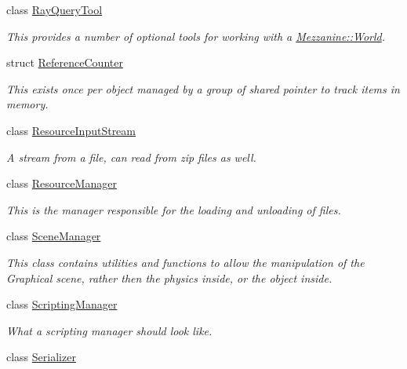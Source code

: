 \begin{DoxyCompactItemize}
class \hyperlink{classMezzanine_1_1RayQueryTool}{RayQueryTool}
\begin{DoxyCompactList}\small\item\em This provides a number of optional tools for working with a \hyperlink{classMezzanine_1_1World}{Mezzanine::World}. \item\end{DoxyCompactList}\item 
struct \hyperlink{structMezzanine_1_1ReferenceCounter}{ReferenceCounter}
\begin{DoxyCompactList}\small\item\em This exists once per object managed by a group of shared pointer to track items in memory. \item\end{DoxyCompactList}\item 
class \hyperlink{classMezzanine_1_1ResourceInputStream}{ResourceInputStream}
\begin{DoxyCompactList}\small\item\em A stream from a file, can read from zip files as well. \item\end{DoxyCompactList}\item 
class \hyperlink{classMezzanine_1_1ResourceManager}{ResourceManager}
\begin{DoxyCompactList}\small\item\em This is the manager responsible for the loading and unloading of files. \item\end{DoxyCompactList}\item 
class \hyperlink{classMezzanine_1_1SceneManager}{SceneManager}
\begin{DoxyCompactList}\small\item\em This class contains utilities and functions to allow the manipulation of the Graphical scene, rather then the physics inside, or the object inside. \item\end{DoxyCompactList}\item 
class \hyperlink{classMezzanine_1_1ScriptingManager}{ScriptingManager}
\begin{DoxyCompactList}\small\item\em What a scripting manager should look like. \item\end{DoxyCompactList}\item 
class \hyperlink{classMezzanine_1_1Serializer}{Serializer}

\end{DoxyCompactItemize}
